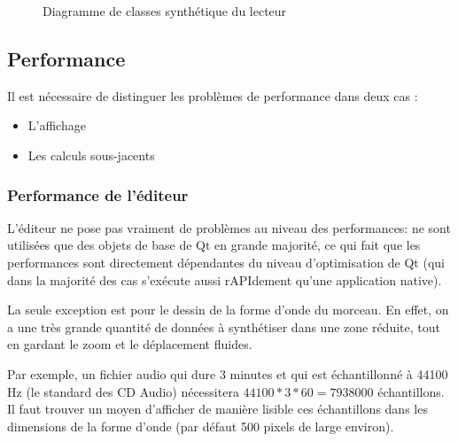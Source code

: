 \begin{figure}[H]
\begin{center}
\caption{Diagramme de classes synthétique du lecteur}
\label{diag_player}
\end{center}
\end{figure}

\subsection{Performance}
Il est nécessaire de distinguer les problèmes de performance dans deux cas :

\begin{itemize}
	\item L'affichage
	\item Les calculs sous-jacents
\end{itemize}

\subsubsection{Performance de l'éditeur}
L'éditeur ne pose pas vraiment de problèmes au niveau des performances: ne sont utilisées que des
objets de base de Qt en grande majorité, ce qui fait que les performances sont directement dépendantes du niveau
d'optimisation de Qt (qui dans la majorité des cas s'exécute aussi r\ac{API}dement qu'une application native).

La seule exception est pour le dessin de la forme d'onde du morceau. En effet, on a une très grande quantité de données à synthétiser dans
une zone réduite, tout en gardant le zoom et le déplacement fluides.

Par exemple, un fichier audio qui dure 3 minutes et qui est échantillonné à 44100 Hz (le standard des CD Audio)
nécessitera $44100 * 3 * 60 = 7938000$ échantillons. Il faut trouver un moyen d'afficher de manière lisible ces
échantillons dans les dimensions de la forme d'onde (par défaut 500 pixels de large environ).

